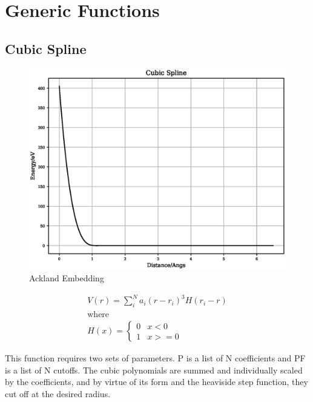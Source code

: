 \clearpage
\FloatBarrier
\section{Generic Functions}



\FloatBarrier
\subsection{Cubic Spline}

\begin{figure}[h]
  \begin{center}
    \includegraphics[width=120mm]{appendix/functions/plots/cubic_spline.eps}
    \caption{Ackland Embedding}
    \label{graph:graph1}
  \end{center}
\end{figure}

\begin{equation}
\begin{split}
V(r) = \sum_i^N a_i (r - r_i)^3 H(r_i - r) \\
\text{where } \\
H(x) = \left\{ \begin{matrix} 0 & x<0 \\  1 & x >= 0 \end{matrix} \right . 
\end{split}
\label{eq:cubicSpline}
\end{equation}

This function requires two sets of parameters.  P is a list of N coefficients and PF is a list of N cutoffs.  The cubic polynomials are summed and individually scaled by the coefficients, and by virtue of its form and the heaviside step function, they cut off at the desired radius. 

